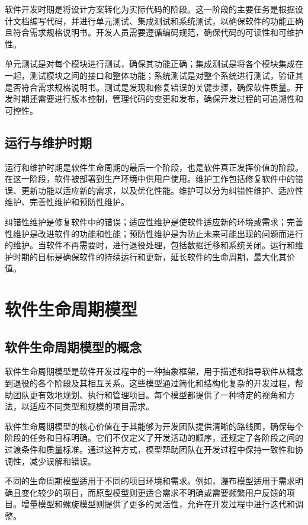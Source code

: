软件开发时期是将设计方案转化为实际代码的阶段。这一阶段的主要任务是根据设计文档编写代码，并进行单元测试、集成测试和系统测试，以确保软件的功能正确且符合需求规格说明书。开发人员需要遵循编码规范，确保代码的可读性和可维护性。

单元测试是对每个模块进行测试，确保其功能正确；集成测试是将各个模块集成在一起，测试模块之间的接口和整体功能；系统测试是对整个系统进行测试，验证其是否符合需求规格说明书。测试是发现和修复错误的关键步骤，确保软件质量。开发时期还需要进行版本控制，管理代码的变更和发布，确保开发过程的可追溯性和可控性。

\subsection{运行与维护时期}

运行和维护时期是软件生命周期的最后一个阶段，也是软件真正发挥价值的阶段。在这一阶段，软件被部署到生产环境中供用户使用。维护工作包括修复软件中的错误、更新功能以适应新的需求，以及优化性能。维护可以分为纠错性维护、适应性维护、完善性维护和预防性维护。

纠错性维护是修复软件中的错误；适应性维护是使软件适应新的环境或需求；完善性维护是改进软件的功能和性能；预防性维护是为防止未来可能出现的问题而进行的维护。当软件不再需要时，进行退役处理，包括数据迁移和系统关闭。运行和维护时期的目标是确保软件的持续运行和更新，延长软件的生命周期，最大化其价值。

\section{软件生命周期模型}

\subsection{软件生命周期模型的概念}

软件生命周期模型是软件开发过程中的一种抽象框架，用于描述和指导软件从概念到退役的各个阶段及其相互关系。这些模型通过简化和结构化复杂的开发过程，帮助团队更有效地规划、执行和管理项目。每个模型都提供了一种特定的视角和方法，以适应不同类型和规模的项目需求。

软件生命周期模型的核心价值在于其能够为开发团队提供清晰的路线图，确保每个阶段的任务和目标明确。它们不仅定义了开发活动的顺序，还规定了各阶段之间的过渡条件和质量标准。通过这种方式，模型帮助团队在开发过程中保持一致性和协调性，减少误解和错误。

不同的生命周期模型适用于不同的项目环境和需求。例如，瀑布模型适用于需求明确且变化较少的项目，而原型模型则更适合需求不明确或需要频繁用户反馈的项目。增量模型和螺旋模型则提供了更多的灵活性，允许在开发过程中进行迭代和调整。

